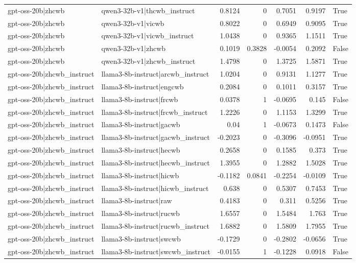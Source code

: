 \begin{table}
\begin{tabular}{l l r r r r l}
gpt-oss-20b|zhcwb & qwen3-32b-v1|thcwb_instruct & 0.8124 & 0 & 0.7051 & 0.9197 & True \\
gpt-oss-20b|zhcwb & qwen3-32b-v1|vicwb & 0.8022 & 0 & 0.6949 & 0.9095 & True \\
gpt-oss-20b|zhcwb & qwen3-32b-v1|vicwb_instruct & 1.0438 & 0 & 0.9365 & 1.1511 & True \\
gpt-oss-20b|zhcwb & qwen3-32b-v1|zhcwb & 0.1019 & 0.3828 & -0.0054 & 0.2092 & False \\
gpt-oss-20b|zhcwb & qwen3-32b-v1|zhcwb_instruct & 1.4798 & 0 & 1.3725 & 1.5871 & True \\
gpt-oss-20b|zhcwb_instruct & llama3-8b-instruct|arcwb_instruct & 1.0204 & 0 & 0.9131 & 1.1277 & True \\
gpt-oss-20b|zhcwb_instruct & llama3-8b-instruct|engcwb & 0.2084 & 0 & 0.1011 & 0.3157 & True \\
gpt-oss-20b|zhcwb_instruct & llama3-8b-instruct|frcwb & 0.0378 & 1 & -0.0695 & 0.145 & False \\
gpt-oss-20b|zhcwb_instruct & llama3-8b-instruct|frcwb_instruct & 1.2226 & 0 & 1.1153 & 1.3299 & True \\
gpt-oss-20b|zhcwb_instruct & llama3-8b-instruct|gacwb & 0.04 & 1 & -0.0673 & 0.1473 & False \\
gpt-oss-20b|zhcwb_instruct & llama3-8b-instruct|gacwb_instruct & -0.2023 & 0 & -0.3096 & -0.0951 & True \\
gpt-oss-20b|zhcwb_instruct & llama3-8b-instruct|hecwb & 0.2658 & 0 & 0.1585 & 0.373 & True \\
gpt-oss-20b|zhcwb_instruct & llama3-8b-instruct|hecwb_instruct & 1.3955 & 0 & 1.2882 & 1.5028 & True \\
gpt-oss-20b|zhcwb_instruct & llama3-8b-instruct|hicwb & -0.1182 & 0.0841 & -0.2254 & -0.0109 & True \\
gpt-oss-20b|zhcwb_instruct & llama3-8b-instruct|hicwb_instruct & 0.638 & 0 & 0.5307 & 0.7453 & True \\
gpt-oss-20b|zhcwb_instruct & llama3-8b-instruct|raw & 0.4183 & 0 & 0.311 & 0.5256 & True \\
gpt-oss-20b|zhcwb_instruct & llama3-8b-instruct|rucwb & 1.6557 & 0 & 1.5484 & 1.763 & True \\
gpt-oss-20b|zhcwb_instruct & llama3-8b-instruct|rucwb_instruct & 1.6882 & 0 & 1.5809 & 1.7955 & True \\
gpt-oss-20b|zhcwb_instruct & llama3-8b-instruct|swcwb & -0.1729 & 0 & -0.2802 & -0.0656 & True \\
gpt-oss-20b|zhcwb_instruct & llama3-8b-instruct|swcwb_instruct & -0.0155 & 1 & -0.1228 & 0.0918 & False \\

\end{tabular}
\end{table}
